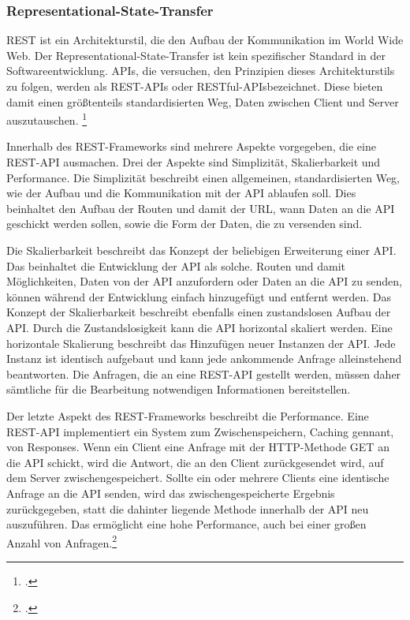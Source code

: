 \subsubsection{Representational-State-Transfer}
REST ist ein Architekturstil, die den Aufbau der Kommunikation im World Wide Web. Der Representational-State-Transfer ist kein spezifischer Standard in der Softwareentwicklung. APIs, die versuchen, den Prinzipien dieses Architekturstils zu folgen, werden als \glqq REST-APIs\grqq{} oder \glqq RESTful-APIs\grqq bezeichnet. Diese bieten damit einen größtenteils standardisierten Weg, Daten zwischen Client und Server auszutauschen. \footcite{richards2006representational}

Innerhalb des REST-Frameworks sind mehrere Aspekte vorgegeben, die eine REST-API ausmachen. Drei der Aspekte sind Simplizität, Skalierbarkeit und Performance. Die Simplizität beschreibt einen allgemeinen, standardisierten Weg, wie der Aufbau und die Kommunikation mit der API ablaufen soll. Dies beinhaltet den Aufbau der Routen und damit der URL, wann Daten an die API geschickt werden sollen, sowie die Form der Daten, die zu versenden sind. 

Die Skalierbarkeit beschreibt das Konzept der beliebigen Erweiterung einer API. Das beinhaltet die Entwicklung der API als solche. Routen und damit Möglichkeiten, Daten von der API anzufordern oder Daten an die API zu senden, können während der Entwicklung einfach hinzugefügt und entfernt werden. Das Konzept der Skalierbarkeit beschreibt ebenfalls einen zustandslosen Aufbau der API. Durch die Zustandslosigkeit kann die API horizontal skaliert werden. Eine horizontale Skalierung beschreibt das Hinzufügen neuer Instanzen der API. Jede Instanz ist identisch aufgebaut und kann jede ankommende Anfrage alleinstehend beantworten. Die Anfragen, die an eine REST-API gestellt werden, müssen daher sämtliche für die Bearbeitung notwendigen Informationen bereitstellen.

Der letzte Aspekt des REST-Frameworks beschreibt die Performance. Eine REST-API implementiert ein System zum Zwischenspeichern, Caching gennant, von Responses. Wenn ein Client eine Anfrage mit der HTTP-Methode GET an die API schickt, wird die Antwort, die an den Client zurückgesendet wird, auf dem Server zwischengespeichert. Sollte ein oder mehrere Clients eine identische Anfrage an die API senden, wird das zwischengespeicherte Ergebnis zurückgegeben, statt die dahinter liegende Methode innerhalb der API neu auszuführen. Das ermöglicht eine hohe Performance, auch bei einer großen Anzahl von Anfragen.\footcite{masse2011rest}

